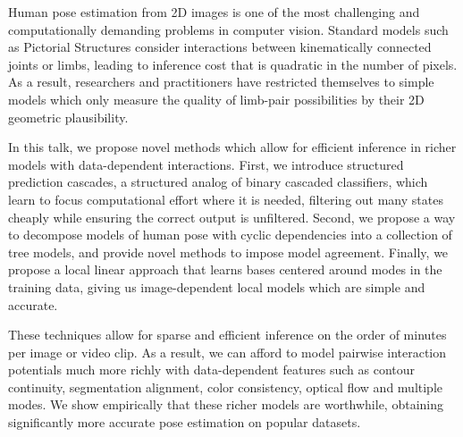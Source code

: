 Human pose estimation from 2D images is one of the most challenging and 
computationally demanding problems in computer vision. Standard models such as 
Pictorial Structures consider interactions between kinematically connected 
joints or limbs, leading to inference cost that is quadratic in the number of 
pixels. As a result, researchers and practitioners have restricted themselves 
to simple models which only measure the quality of limb-pair possibilities by 
their 2D geometric plausibility.

In this talk, we propose novel methods which allow for efficient inference in 
richer models with data-dependent interactions. First, we introduce structured 
prediction cascades, a structured analog of binary cascaded classifiers, which 
learn to focus computational effort where it is needed, filtering out many 
states cheaply while ensuring the correct output is unfiltered. Second, we 
propose a way to decompose models of human pose with cyclic dependencies into a 
collection of tree models, and provide novel methods to impose model agreement.  
Finally, we propose a local linear approach that learns bases centered around 
modes in the training data, giving us image-dependent local models which are 
simple and accurate. 

These techniques allow for sparse and efficient inference on the order of 
minutes per image or video clip. As a result, we can afford to model pairwise 
interaction potentials much more richly with data-dependent features such as 
contour continuity, segmentation alignment, color consistency, optical flow and 
multiple modes. We show empirically that these richer models are worthwhile, 
obtaining significantly more accurate pose estimation on popular datasets.



